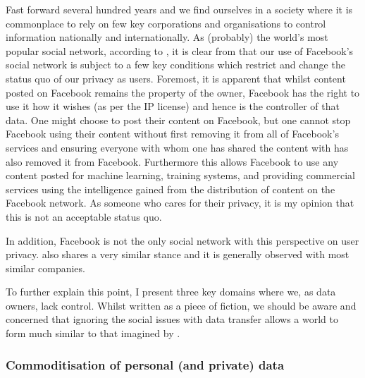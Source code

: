 Fast forward several hundred years and we find ourselves in a society where it is commonplace to rely on few key corporations and organisations to control information nationally and internationally. As (probably) the world's most popular social network, according to \cite{worldmapsocialnetworks:2017:online}, it is clear from \cite{facebookterms:2015:online} that our use of Facebook's social network is subject to a few key conditions which restrict and change the status quo of our privacy as users. Foremost, it is apparent that whilst content posted on Facebook remains the property of the owner, Facebook has the right to use it how it wishes (as per the IP license) and hence is the controller of that data. One might choose to post their content on Facebook, but one cannot stop Facebook using their content without first removing it from all of Facebook's services and ensuring everyone with whom one has shared the content with has also removed it from Facebook. Furthermore this allows Facebook to use any content posted for machine learning, training systems, and providing commercial services using the intelligence gained from the distribution of content on the Facebook network. As someone who cares for their privacy, it is my opinion that this is not an acceptable status quo.

In addition, Facebook is not the only social network with this perspective on user privacy. \cite{twittertos:2017:online} also shares a very similar stance and it is generally observed with most similar companies.



To further explain this point, I present three key domains where we, as data owners, lack control. Whilst written as a piece of fiction, we should be aware and concerned that ignoring the social issues with data transfer allows a world to form much similar to that imagined by \cite{orwell:1984:book}.

\subsubsection{Commoditisation of personal (and private) data}

